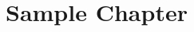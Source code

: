 \setcounter{chapter}{-1}
\chapter{Sample Chapter}
\label{sec:sample}

\begin{refsection}

\localtableofcontents




\clearpage
\printbibliography[heading=subbibintoc]

\begin{subappendices}
    
    
\end{subappendices}

\end{refsection}
